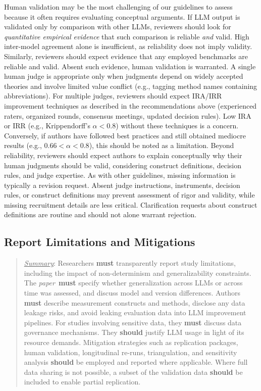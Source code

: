 \documentclass[smallextended]{svjour3}
\newcommand{\must}{\textbf{must}\xspace}
\newcommand{\should}{\textbf{should}\xspace}
\newcommand{\summary}{\underline{\emph{Summary}}\xspace}
\newcommand{\summary}{\textbf{\emph{Summary}}\xspace}
\newcommand{\paper}{\emph{paper}\xspace}
\newcommand{\paper}{\emph{paper}\xspace}
\newenvironment{framed}{\begin{quote}}{\end{quote}}
\begin{document}
Human validation may be the most challenging of our guidelines to assess because it often requires evaluating conceptual arguments. If LLM output is validated only by comparison with other LLMs, reviewers should look for \textit{quantitative empirical evidence} that such comparison is reliable \textit{and} valid. High inter-model agreement alone is insufficient, as reliability does not imply validity. Similarly, reviewers should expect evidence that any employed benchmarks are reliable and valid. Absent such evidence, human validation is warranted.
A single human judge is appropriate only when judgments depend on widely accepted theories and involve limited value conflict (e.g., tagging method names containing abbreviations). For multiple judges, reviewers should expect IRA/IRR improvement techniques as described in the recommendations above (experienced raters, organized rounds, consensus meetings, updated decision rules). Low IRA or IRR (e.g., Krippendorff's $\alpha<0.8$) without these techniques is a concern. Conversely, if authors have followed best practices and still obtained mediocre results (e.g., $0.66<\alpha<0.8$), this should be noted as a limitation.
Beyond reliability, reviewers should expect authors to explain conceptually why their human judgments should be valid, considering construct definitions, decision rules, and judge expertise.
As with other guidelines, missing information is typically a revision request. Absent judge instructions, instruments, decision rules, or construct definitions may prevent assessment of rigor and validity, while missing recruitment details are less critical. Clarification requests about construct definitions are routine and should not alone warrant rejection. 
\subsection{Report Limitations and Mitigations}
\label{sec:report-limitations-and-mitigations}

\vspace{0.5\baselineskip}
\begin{framed}
\summary: Researchers \must transparently report study limitations, including the impact of non-determinism and generalizability constraints. The \paper~\must specify whether generalization across LLMs or across time was assessed, and discuss model and version differences. Authors \must describe measurement constructs and methods, disclose any data leakage risks, and avoid leaking evaluation data into LLM improvement pipelines. For studies involving sensitive data, they \must discuss data governance mechanisms. They \should justify LLM usage in light of its resource demands. Mitigation strategies such as replication packages, human validation, longitudinal re-runs, triangulation, and sensitivity analysis \should be employed and reported where applicable. Where full data sharing is not possible, a subset of the validation data \should be included to enable partial replication. \end{framed}
\end{document}
